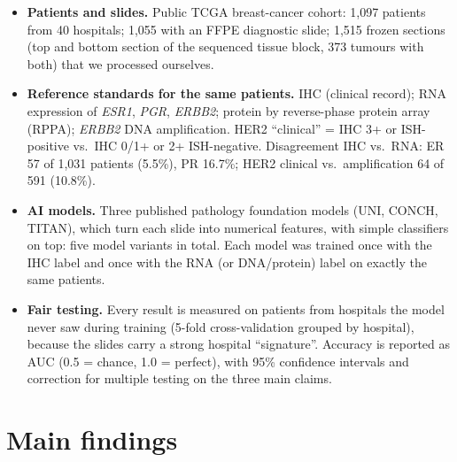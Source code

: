 \documentclass[10pt,a4paper]{article}
\begin{document}
\begin{itemize}
  \item \textbf{Patients and slides.} Public TCGA breast-cancer cohort: 1,097 patients from 40 hospitals; 1,055 with an
        FFPE diagnostic slide; 1,515 frozen sections (top and bottom section of the sequenced tissue block, 373
        tumours with both) that we processed ourselves.
  \item \textbf{Reference standards for the same patients.} IHC (clinical record); RNA expression of \emph{ESR1},
        \emph{PGR}, \emph{ERBB2}; protein by reverse-phase protein array (RPPA); \emph{ERBB2} DNA amplification. HER2
        ``clinical'' = IHC 3+ or ISH-positive vs.\ IHC 0/1+ or 2+ ISH-negative. Disagreement IHC vs.\ RNA: ER 57 of 1,031
        patients (5.5\%), PR 16.7\%; HER2 clinical vs.\ amplification 64 of 591 (10.8\%).
  \item \textbf{AI models.} Three published pathology foundation models (UNI, CONCH, TITAN), which turn each slide into
        numerical features, with simple classifiers on top: five model variants in total. Each model was trained once
        with the IHC label and once with the RNA (or DNA/protein) label on exactly the same patients.
  \item \textbf{Fair testing.} Every result is measured on patients from hospitals the model never saw during training
        (5-fold cross-validation grouped by hospital), because the slides carry a strong hospital ``signature''.
        Accuracy is reported as AUC (0.5 = chance, 1.0 = perfect), with 95\% confidence intervals and correction for
        multiple testing on the three main claims.
\end{itemize}

\section{Main findings}
\end{document}
